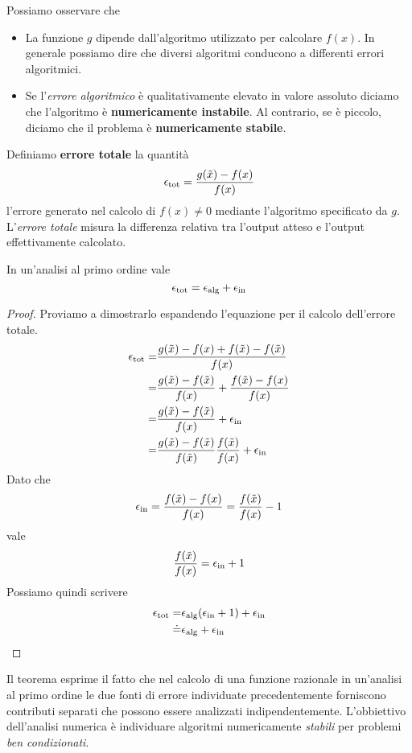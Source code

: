 \begin{observation}
	Possiamo osservare che
	\begin{itemize}
		\item La funzione $g$ dipende dall'algoritmo utilizzato per calcolare $f(x)$. In generale possiamo dire
		      che diversi algoritmi conducono a differenti errori algoritmici.
		\item Se l'\emph{errore algoritmico} è qualitativamente elevato in valore assoluto diciamo che l'algoritmo
		      è \textbf{numericamente instabile}. Al contrario, se è piccolo, diciamo che il problema è
		      \textbf{numericamente stabile}.
	\end{itemize}
\end{observation}

\begin{definition}
	Definiamo \textbf{errore totale} la quantità
	\[ \epsilon_{\text{tot}} = \frac{g(\tilde{x}) - f(x)}{f(x)} \]
	l'errore generato nel calcolo di $f(x) \neq 0$ mediante l'algoritmo specificato da $g$. L'\emph{errore totale}
	misura la differenza relativa tra l'output atteso e l'output effettivamente calcolato.
\end{definition}

\begin{theorem}
	In un'analisi al primo ordine vale
	\[ \epsilon_\text{tot} = \epsilon_\text{alg} + \epsilon_\text{in} \]
	\begin{proof}
		Proviamo a dimostrarlo espandendo l'equazione per il calcolo dell'errore totale.
		\begin{align*}
			\epsilon_{\text{tot}} = & \frac{g(\tilde{x}) - f(x) + f(\tilde{x}) - f(\tilde{x})}{f(x)}              \\
			=                       & \frac{g(\tilde{x}) - f(\tilde{x})}{f(x)} + \frac{f(\tilde{x}) - f(x)}{f(x)} \\
			=                       & \frac{g(\tilde{x}) - f(\tilde{x})}{f(x)} + \epsilon_\text{in}                       \\
			=                       & \frac{g(\tilde{x}) - f(\tilde{x})}{f(\tilde{x})} \frac{f(\tilde{x})}{f(x)} + \epsilon_\text{in}
		\end{align*}
		Dato che
		\[ \epsilon_\text{in} = \frac{f(\tilde{x}) - f(x)}{f(x)} = \frac{f(\tilde{x})}{f(x)} - 1 \]
		vale
		\[ \frac{f(\tilde{x})}{f(x)} = \epsilon_\text{in} + 1 \]
		Possiamo quindi scrivere
		\begin{align*}
			\epsilon_\text{tot} = & \epsilon_\text{alg} (\epsilon_\text{in} + 1) + \epsilon_\text{in} \\
			\doteq  & \epsilon_\text{alg} + \epsilon_\text{in}
		\end{align*}
	\end{proof}
\end{theorem}

Il teorema esprime il fatto che nel calcolo di una funzione razionale in un'analisi al primo ordine le due fonti
di errore individuate precedentemente forniscono contributi separati che possono essere analizzati
indipendentemente. L'obbiettivo dell'analisi numerica è individuare algoritmi numericamente \emph{stabili} per
problemi \emph{ben condizionati}.